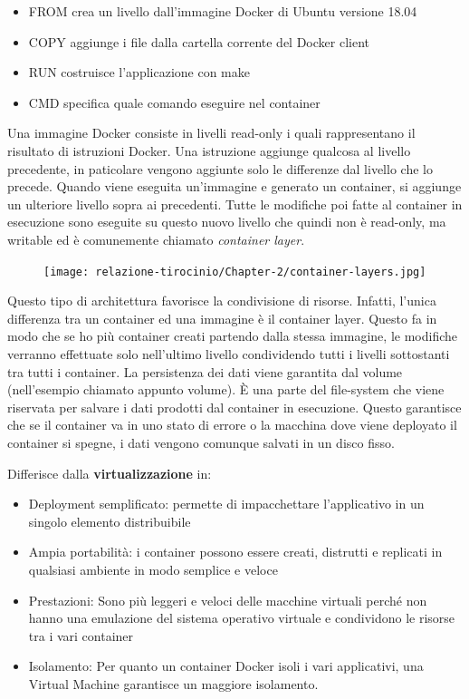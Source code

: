 \documentclass[a4paper,10pt]{memoir}
\begin{document}
\begin{itemize}
    \item FROM crea un livello dall'immagine Docker di Ubuntu versione 18.04
    \item COPY aggiunge i file dalla cartella corrente del Docker client
    \item RUN costruisce l'applicazione con make
    \item CMD specifica quale comando eseguire nel container
\end{itemize}
Una immagine Docker consiste in livelli read-only i quali rappresentano il risultato di istruzioni Docker. Una istruzione aggiunge qualcosa al livello precedente, in paticolare vengono aggiunte solo le differenze dal livello che lo precede.
Quando viene eseguita un'immagine e generato un container, si aggiunge un ulteriore livello sopra ai precedenti.
Tutte le modifiche poi fatte al container in esecuzione sono eseguite su questo nuovo livello che quindi non è read-only, ma writable ed è comunemente chiamato \textit{container layer}.
\begin{figure}[ht]
\texttt{[image: relazione-tirocinio/Chapter-2/container-layers.jpg]}
\end{figure}
Questo tipo di architettura favorisce la condivisione di risorse. Infatti, l'unica differenza tra un container ed una immagine è il container layer. Questo fa in modo che se ho più container creati partendo dalla stessa immagine, le modifiche verranno effettuate solo nell'ultimo livello condividendo tutti i livelli sottostanti tra tutti i container\cite{aboutstoragedrivers}.
La persistenza dei dati viene garantita dal volume (nell'esempio chiamato appunto volume). 
È una parte del file-system che viene riservata per salvare i dati prodotti dal container in esecuzione.
Questo garantisce che se il container va in uno stato di errore o la macchina dove viene deployato il container si spegne, i dati vengono comunque salvati in un disco fisso.

Differisce dalla \textbf{virtualizzazione} \cite{dockervsvm2} in:

\begin{itemize}
    \item Deployment semplificato: permette di impacchettare l'applicativo in un singolo elemento distribuibile
    \item Ampia portabilità: i container possono essere creati, distrutti e replicati in qualsiasi ambiente in modo semplice e veloce
    \item Prestazioni: Sono più leggeri e veloci delle macchine virtuali perché non hanno una emulazione del sistema operativo virtuale e condividono le risorse tra i vari container
    \item Isolamento: Per quanto un container Docker isoli i vari applicativi, una Virtual Machine garantisce un maggiore isolamento.
\end{itemize}
\end{document}
